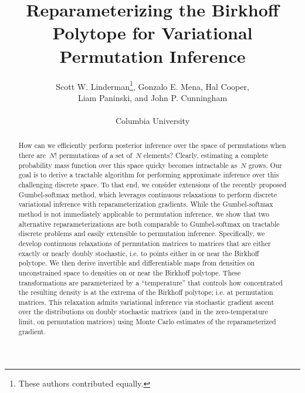 



\title{Reparameterizing the Birkhoff Polytope for Variational Permutation Inference}
\author{
  Scott W. Linderman\thanks{These authors contributed equally.}, Gonzalo E. Mena\footnotemark[1], Hal Cooper, \\
  Liam Paninski, and John P. Cunningham\\
  \\
  Columbia University
}


\maketitle

\begin{abstract}
  How can we efficiently perform posterior inference over the space
  of permutations when there are~$N!$ permutations of a set of~$N$
  elements?  Clearly, estimating a complete probability mass function
  over this space quicky becomes intractable as~$N$ grows. Our goal is
  to derive a tractable algorithm for performing approximate inference
  over this challenging discrete space.  To that end, we consider
  extensions of the recently proposed Gumbel-softmax method, which
  leverages continuous relaxations to perform discrete variational
  inference with reparameterization gradients. While the
  Gumbel-softmax method is not immediately applicable to permutation
  inference, we show that two alternative reparameterizations are both
  comparable to Gumbel-softmax on tractable discrete problems and
  easily extensible to permutation inference. Specifically, we develop
  continuous relaxations of permutation matrices to matrices that are
  either exactly or nearly doubly stochastic, i.e. to points either in
  or near the Birkhoff polytope.  We then derive invertible and
  differentiable maps from densities on unconstrained space to
  densities on or near the Birkhoff polytope. These transformations
  are parameterized by a ``temperature'' that controls how
  concentrated the resulting density is at the extrema of the Birkhoff
  polytope; i.e. at permutation matrices.  This relaxation admits
  variational inference via stochastic gradient ascent over the
  distributions on doubly stochastic matrices (and in the
  zero-temperature limit, on permutation matrices) using Monte Carlo
  estimates of the reparameterized gradient.
\end{abstract}

